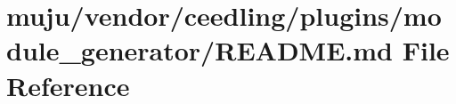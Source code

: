 \hypertarget{vendor_2ceedling_2plugins_2module__generator_2_r_e_a_d_m_e_8md}{}\section{muju/vendor/ceedling/plugins/module\+\_\+generator/\+R\+E\+A\+D\+ME.md File Reference}
\label{vendor_2ceedling_2plugins_2module__generator_2_r_e_a_d_m_e_8md}
